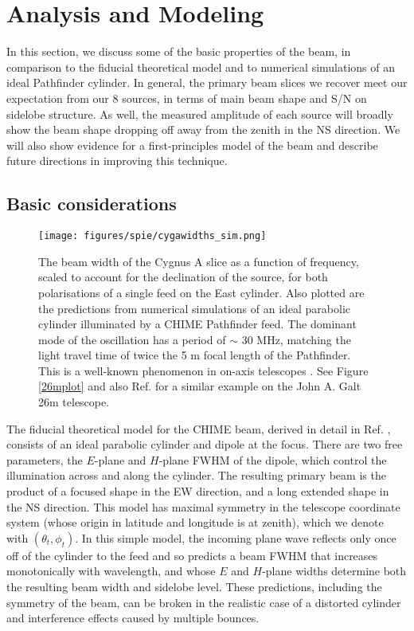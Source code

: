 \section{Analysis and Modeling} \label{ch:hol:sec:analysis}

In this section, we discuss some of the basic properties of the beam, in comparison to the fiducial theoretical model and to numerical simulations of an ideal Pathfinder cylinder. In general, the primary beam slices we recover meet our expectation from our 8 sources, in terms of main beam shape and S/N on sidelobe structure. As well, the measured amplitude of each source will broadly show the beam shape dropping off away from the zenith in the NS direction. We will also show evidence for a first-principles model of the beam and describe future directions in improving this technique.

\subsection{Basic considerations}

\begin{figure}[h!] %
	\centering
	\texttt{[image: figures/spie/cygawidths\_sim.png]}%
	\caption{The beam width of the Cygnus A slice as a function of frequency, scaled to account for the declination of the source, for both polarisations of a single feed on the East cylinder. Also plotted are the predictions from numerical simulations of an ideal parabolic cylinder illuminated by a CHIME Pathfinder feed. The dominant mode of the oscillation has a period of $\sim$ 30 MHz, matching the light travel time of twice the 5 m focal length of the Pathfinder. This is a well-known phenomenon in on-axis telescopes \citep{wander1, wander2}. See Figure \ref{26mplot} and also Ref. \citep{wolleben1} for a similar example on the John A. Galt 26m telescope.}
	\label{beamwidths}
\end{figure}

The fiducial theoretical model for the CHIME beam, derived in detail in Ref. \citep{mmodes2}, consists of an ideal parabolic cylinder and dipole at the focus. There are two free parameters, the $E$-plane and $H$-plane FWHM of the dipole, which control the illumination across and along the cylinder. The resulting primary beam is the product of a focused shape in the EW direction, and a long extended shape in the NS direction. This model has maximal symmetry in the telescope coordinate system (whose origin in latitude and longitude is at zenith), which we denote with $(\theta_t, \phi_t)$. In this simple model, the incoming plane wave reflects only once off of the cylinder to the feed and so predicts a beam FWHM that increases monotonically with wavelength, and whose $E$ and $H$-plane widths determine both the resulting beam width and sidelobe level. These predictions, including the symmetry of the beam, can be broken in the realistic case of a distorted cylinder and interference effects caused by multiple bounces. 

